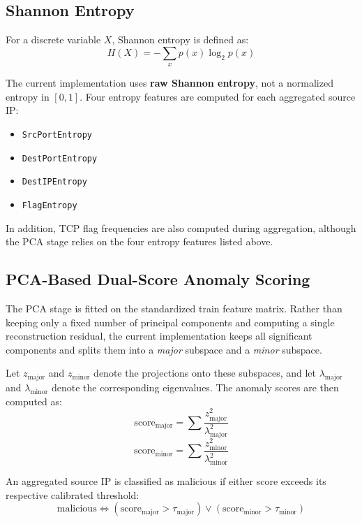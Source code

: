 \documentclass{article}
\begin{document}
\subsection{Shannon Entropy}

For a discrete variable $X$, Shannon entropy is defined as:
\begin{equation}
H(X) = -\sum_x p(x)\log_2 p(x)
\end{equation}

The current implementation uses \textbf{raw Shannon entropy}, not a normalized entropy in $[0,1]$. Four entropy features are computed for each aggregated source IP:
\begin{itemize}
  \item \texttt{SrcPortEntropy}
  \item \texttt{DestPortEntropy}
  \item \texttt{DestIPEntropy}
  \item \texttt{FlagEntropy}
\end{itemize}

In addition, TCP flag frequencies are also computed during aggregation, although the PCA stage relies on the four entropy features listed above.

\subsection{PCA-Based Dual-Score Anomaly Scoring}

The PCA stage is fitted on the standardized train feature matrix. Rather than keeping only a fixed number of principal components and computing a single reconstruction residual, the current implementation keeps all significant components and splits them into a \emph{major} subspace and a \emph{minor} subspace.

Let $z_{\text{major}}$ and $z_{\text{minor}}$ denote the projections onto these subspaces, and let $\lambda_{\text{major}}$ and $\lambda_{\text{minor}}$ denote the corresponding eigenvalues. The anomaly scores are then computed as:
\begin{equation}
\text{score}_{\text{major}} = \sum \frac{z_{\text{major}}^2}{\lambda_{\text{major}}^2}
\end{equation}
\begin{equation}
\text{score}_{\text{minor}} = \sum \frac{z_{\text{minor}}^2}{\lambda_{\text{minor}}^2}
\end{equation}

An aggregated source IP is classified as malicious if either score exceeds its respective calibrated threshold:
\begin{equation}
\text{malicious} \iff \left(\text{score}_{\text{major}} > \tau_{\text{major}}\right) \lor \left(\text{score}_{\text{minor}} > \tau_{\text{minor}}\right)
\end{equation}
\end{document}
